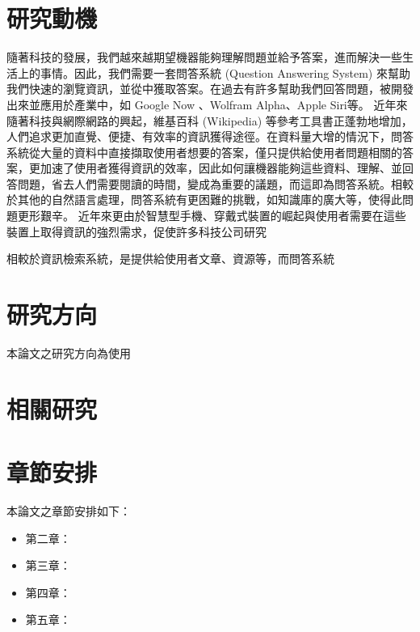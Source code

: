 \section{研究動機}
隨著科技的發展，我們越來越期望機器能夠理解問題並給予答案，進而解決一些生活上的事情。因此，我們需要一套問答系統 (Question Answering System) 來幫助我們快速的瀏覽資訊，並從中獲取答案。在過去有許多幫助我們回答問題，被開發出來並應用於產業中，如 Google Now 、Wolfram Alpha、Apple Siri等。
近年來隨著科技與網際網路的興起，維基百科 (Wikipedia) 等參考工具書正蓬勃地增加，人們追求更加直覺、便捷、有效率的資訊獲得途徑。在資料量大增的情況下，問答系統從大量的資料中直接擷取使用者想要的答案，僅只提供給使用者問題相關的答案，更加速了使用者獲得資訊的效率，因此如何讓機器能夠這些資料、理解、並回答問題，省去人們需要閱讀的時間，變成為重要的議題，而這即為問答系統。相較於其他的自然語言處理，問答系統有更困難的挑戰，如知識庫的廣大等，使得此問題更形艱辛。
近年來更由於智慧型手機、穿戴式裝置的崛起與使用者需要在這些裝置上取得資訊的強烈需求，促使許多科技公司研究

相較於資訊檢索系統，是提供給使用者文章、資源等，而問答系統

\section{研究方向}
本論文之研究方向為使用

\section{相關研究}

\section{章節安排}
本論文之章節安排如下：

\begin{itemize}
\itemsep -2pt
    \item 第二章：
    \item 第三章：
    \item 第四章：
    \item 第五章：
\end{itemize}
